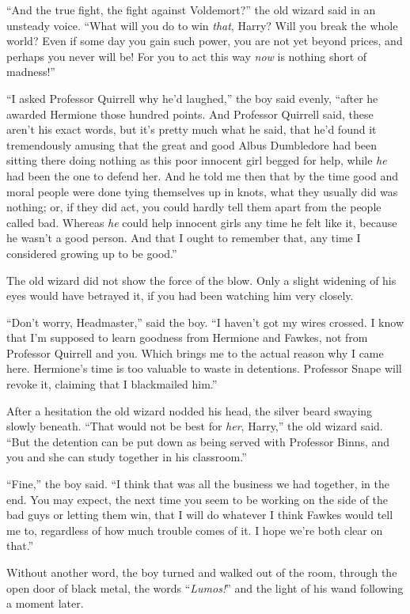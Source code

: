 “And the true fight, the fight against Voldemort?” the old wizard said in an unsteady voice. “What will you do to win \emph{that}, Harry? Will you break the whole world? Even if some day you gain such power, you are not yet beyond prices, and perhaps you never will be! For you to act this way \emph{now} is nothing short of madness!”

“I asked Professor Quirrell why he’d laughed,” the boy said evenly, “after he awarded Hermione those hundred points. And Professor Quirrell said, these aren’t his exact words, but it’s pretty much what he said, that he’d found it tremendously amusing that the great and good Albus Dumbledore had been sitting there doing nothing as this poor innocent girl begged for help, while \emph{he} had been the one to defend her. And he told me then that by the time good and moral people were done tying themselves up in knots, what they usually did was nothing; or, if they did act, you could hardly tell them apart from the people called bad. Whereas \emph{he} could help innocent girls any time he felt like it, because he wasn’t a good person. And that I ought to remember that, any time I considered growing up to be good.”

The old wizard did not show the force of the blow. Only a slight widening of his eyes would have betrayed it, if you had been watching him very closely.

“Don’t worry, Headmaster,” said the boy. “I haven’t got my wires crossed. I know that I’m supposed to learn goodness from Hermione and Fawkes, not from Professor Quirrell and you. Which brings me to the actual reason why I came here. Hermione’s time is too valuable to waste in detentions. Professor Snape will revoke it, claiming that I blackmailed him.”

After a hesitation the old wizard nodded his head, the silver beard swaying slowly beneath. “That would not be best for \emph{her}, Harry,” the old wizard said. “But the detention can be put down as being served with Professor Binns, and you and she can study together in his classroom.”

“Fine,” the boy said. “I think that was all the business we had together, in the end. You may expect, the next time you seem to be working on the side of the bad guys or letting them win, that I will do whatever I think Fawkes would tell me to, regardless of how much trouble comes of it. I hope we’re both clear on that.”

Without another word, the boy turned and walked out of the room, through the open door of black metal, the words “\emph{Lumos!}” and the light of his wand following a moment later.

